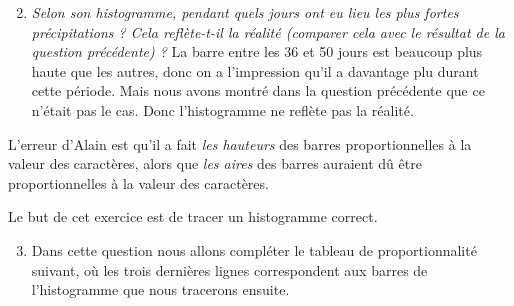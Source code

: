 \documentclass[11pt]{article}
\begin{document}
\begin{exercice}
  \begin{center}
  \end{center}
  \begin{enumerate}
      \setcounter{enumi}{1}
    \item \emph{Selon son histogramme, pendant quels jours ont eu lieu les plus fortes précipitations ? Cela reflète-t-il la réalité (comparer cela avec le résultat de la question précédente) ?}
      La barre entre les 36 et 50 jours est beaucoup plus haute que les autres, donc on a l'impression qu'il a davantage plu durant cette période. Mais nous avons montré dans la question précédente que ce n'était pas le cas. Donc l'histogramme ne reflète pas la réalité.
  \end{enumerate}
  \begin{em}
  L'erreur d'Alain est qu'il a fait \emph{les hauteurs} des barres proportionnelles à
  la valeur des caractères, alors que \emph{les aires} des barres auraient dû être
  proportionnelles à la valeur des caractères.

  Le but de cet exercice est de tracer un histogramme correct.
\end{em}

  \begin{enumerate}
      \setcounter{enumi}{2}
    \item \begin{em}
        Dans cette question nous allons compléter le tableau de
      proportionnalité suivant, où les trois dernières lignes correspondent aux
      barres de l'histogramme que nous tracerons ensuite.
      \end{em}


\end{enumerate}
\end{exercice}
\end{document}
